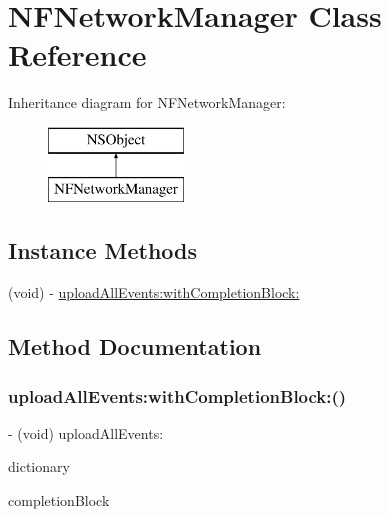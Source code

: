 \hypertarget{interface_n_f_network_manager}{}\section{N\+F\+Network\+Manager Class Reference}
\label{interface_n_f_network_manager}
Inheritance diagram for N\+F\+Network\+Manager\+:\begin{figure}[H]
\begin{center}
\leavevmode
\includegraphics[height=2.000000cm]{interface_n_f_network_manager}
\end{center}
\end{figure}
\subsection*{Instance Methods}
\begin{DoxyCompactItemize}
\item 
(void) -\/ \hyperlink{interface_n_f_network_manager_a146f3a7713b9e65ecb007318cdc7a99c}{upload\+All\+Events\+:with\+Completion\+Block\+:}
\end{DoxyCompactItemize}


\subsection{Method Documentation}
\mbox{\label{interface_n_f_network_manager_a146f3a7713b9e65ecb007318cdc7a99c}} 
\subsubsection{\texorpdfstring{upload\+All\+Events\+:with\+Completion\+Block\+:()}{uploadAllEvents:withCompletionBlock:()}}
{\footnotesize\ttfamily -\/ (void) upload\+All\+Events\+: \begin{DoxyParamCaption}\item[{(N\+S\+Dictionary $\ast$)}]{dictionary }\item[{withCompletionBlock:(Upload\+Completion\+Block)}]{completion\+Block }\end{DoxyParamCaption}}

